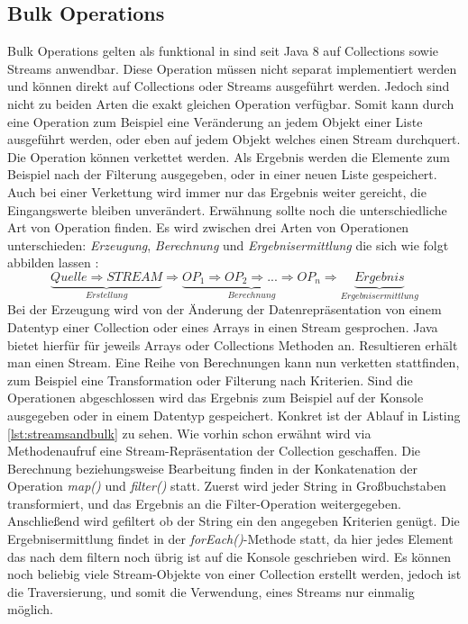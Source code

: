 \subsection{Bulk Operations}
Bulk Operations gelten als funktional in sind seit Java 8 auf Collections sowie Streams anwendbar. Diese Operation müssen nicht separat implementiert werden und können direkt auf Collections oder Streams ausgeführt werden. Jedoch sind nicht zu beiden Arten die exakt gleichen Operation verfügbar. Somit kann durch eine Operation zum Beispiel eine Veränderung an jedem Objekt einer Liste ausgeführt werden, oder eben auf jedem Objekt welches einen Stream durchquert. Die Operation können verkettet werden. Als Ergebnis werden die Elemente zum Beispiel nach der Filterung ausgegeben, oder in einer neuen Liste gespeichert. Auch bei einer Verkettung wird immer nur das Ergebnis weiter gereicht, die Eingangswerte bleiben unverändert. Erwähnung sollte noch die unterschiedliche Art von Operation finden. Es wird zwischen drei Arten von Operationen unterschieden: \textit{Erzeugung}, \textit{Berechnung} und \textit{Ergebnisermittlung} die sich wie folgt abbilden lassen \cite{Inden.2015} : 
\begin{displaymath}
\underbrace{Quelle \Rightarrow STREAM}_{Erstellung} \Rightarrow \underbrace{OP_{1} \Rightarrow OP_{2} \Rightarrow ... \Rightarrow OP_{n}}_{Berechnung} \Rightarrow \underbrace{Ergebnis}_{Ergebnisermittlung}
\end{displaymath}
Bei der Erzeugung wird von der Änderung der Datenrepräsentation von einem Datentyp einer Collection oder eines Arrays in einen Stream gesprochen. Java bietet hierfür für jeweils Arrays oder Collections Methoden an. Resultieren erhält man einen Stream. Eine Reihe von Berechnungen kann nun verketten stattfinden, zum Beispiel eine Transformation oder Filterung nach Kriterien. Sind die Operationen abgeschlossen wird das Ergebnis zum Beispiel auf der Konsole ausgegeben oder in einem Datentyp gespeichert. Konkret ist der Ablauf in Listing \ref{lst:streamsandbulk} zu sehen. Wie vorhin schon erwähnt wird via Methodenaufruf eine Stream-Repräsentation der Collection geschaffen. Die Berechnung beziehungsweise Bearbeitung finden in der Konkatenation der Operation \textit{map()} und \textit{filter()} statt. Zuerst wird jeder String in Großbuchstaben transformiert, und das Ergebnis an die Filter-Operation weitergegeben. Anschließend wird gefiltert ob der String ein den angegeben Kriterien genügt. Die Ergebnisermittlung findet in der \textit{forEach()}-Methode statt, da hier jedes Element das nach dem filtern noch übrig ist auf die Konsole geschrieben wird. Es können noch beliebig viele Stream-Objekte von einer Collection erstellt werden, jedoch ist die Traversierung, und somit die Verwendung, eines Streams nur einmalig möglich.
